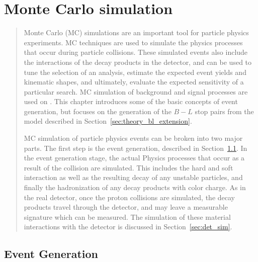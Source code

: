 \chapter[Monte Carlo simulation][Monte Carlo simulation]{Monte Carlo simulation}
\label{ch:mc}

\begin{quote}
  Monte Carlo (MC) simulations are an important tool for particle physics
  experiments.
  MC techniques are used to simulate the physics processes that occur during
  particle collisions.
  These simulated events also include the interactions of the decay products
  in the detector, and can be used to tune the selection of an analysis,
  estimate the expected event yields and kinematic shapes, and ultimately,
  evaluate the expected sensitivity of a particular search.
  MC simulation of background and signal processes are used on \atlas.
  This chapter introduces some of the basic concepts of event generation, but
  focuses on the generation of the $B-L$ stop pairs from the model described in
  Section~\ref{sec:theory_bl_extension}.

  MC simulation of particle physics events can be broken into two major parts.
  The first step is the event generation, described in
  Section~\ref{sec:event_gen}.
  In the event generation stage, the actual Physics processes that occur as a
  result of the collision are simulated.
  This includes the hard and soft interaction as well as the resulting decay of
  any unstable particles, and finally the hadronization of any decay products
  with color charge.
  As in the real detector, once the proton collisions are simulated, the decay
  products travel through the detector, and may leave a measurable signature
  which can be measured.
  The simulation of these material interactions with the detector is discussed
  in Section~\ref{sec:det_sim}.
\end{quote}

\FloatBarrier
\section{Event Generation}
\label{sec:event_gen}

